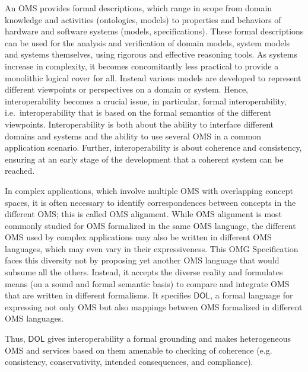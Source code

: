 \documentclass[10pt,fleqn,final]{scrreprt}
\makeatletter
\newcommand*{\eg}{e.g.\@\xspace}
\newcommand*{\IS}{OMG Specification\xspace}
\newcommand*{\DOL}{\ensuremath{\mathsf{DOL}}\xspace}
\makeatother
\begin{document}
An OMS provides formal descriptions, which range in scope from domain knowledge and activities
(ontologies, models) to properties and behaviors of hardware and software systems (models,
specifications). These formal descriptions can be used for the analysis and verification of domain
models, system models and systems themselves, using rigorous and effective reasoning tools.   As 
systems increase in complexity, it becomes concomitantly less practical to provide a monolithic 
logical cover for all.  Instead various models are developed to represent different viewpoints or 
perspectives on a domain or system. 
 Hence, interoperability becomes
a crucial issue, in particular, formal interoperability, i.e.\ interoperability that is based on
the formal semantics of the different viewpoints. Interoperability is both about the ability to 
interface different domains and systems and the ability to use several OMS in a common application
scenario. Further,  interoperability is about coherence and consistency, ensuring at an early stage of the development
that a coherent system can be reached.


In complex applications, which involve multiple OMS with overlapping concept spaces,
it is often necessary to identify correspondences between concepts in the different OMS; this is called  OMS alignment. 
While OMS alignment is most commonly studied for OMS formalized in the same OMS 
language, the different OMS used by complex applications may also be written in different 
OMS languages, which may even vary in their expressiveness. 
This \IS faces this diversity not by proposing yet another OMS language that would subsume all the others.  
Instead, it accepts the diverse reality and formulates means (on a sound and formal semantic basis) 
to compare and integrate OMS that are written in different formalisms.
It specifies \DOL, a formal language for
expressing not only OMS but also mappings between OMS formalized in different OMS languages.

Thus, \DOL gives interoperability a formal grounding and makes heterogeneous OMS and services based
on them amenable to checking of coherence (\eg consistency, conservativity, intended consequences,
and compliance).
\end{document}
